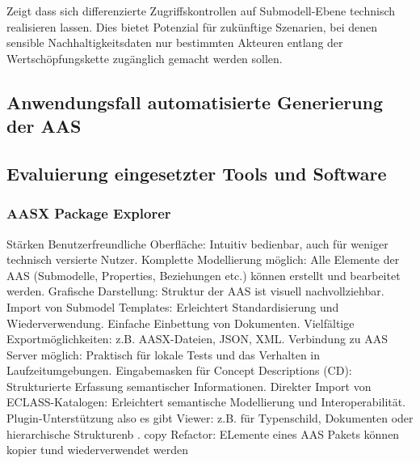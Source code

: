 Zeigt dass sich differenzierte Zugriffskontrollen auf Submodell-Ebene technisch realisieren lassen. 
Dies bietet Potenzial für zukünftige Szenarien, bei denen sensible Nachhaltigkeitsdaten nur bestimmten Akteuren entlang der Wertschöpfungskette zugänglich gemacht werden sollen.

\subsection{Anwendungsfall automatisierte Generierung der AAS}

\subsection{Evaluierung eingesetzter Tools und Software}
\subsubsection{AASX Package Explorer}

Stärken
Benutzerfreundliche Oberfläche: Intuitiv bedienbar, auch für weniger technisch versierte Nutzer.
Komplette Modellierung möglich: Alle Elemente der AAS (Submodelle, Properties, Beziehungen etc.) können erstellt und bearbeitet werden.
Grafische Darstellung: Struktur der AAS ist visuell nachvollziehbar.
Import von Submodel Templates: Erleichtert Standardisierung und Wiederverwendung.
Einfache Einbettung von Dokumenten.
Vielfältige Exportmöglichkeiten: z.B. AASX-Dateien, JSON, XML.
Verbindung zu AAS Server möglich: Praktisch für lokale Tests und das Verhalten in Laufzeitumgebungen.
Eingabemasken für Concept Descriptions (CD): Strukturierte Erfassung semantischer Informationen.
Direkter Import von ECLASS-Katalogen: Erleichtert semantische Modellierung und Interoperabilität.
Plugin-Unterstützung also es gibt Viewer: z.B. für Typenschild, Dokumenten oder hierarchische Strukturenb .
copy Refactor: ELemente eines AAS Pakets können kopier tund wiederverwendet werden


